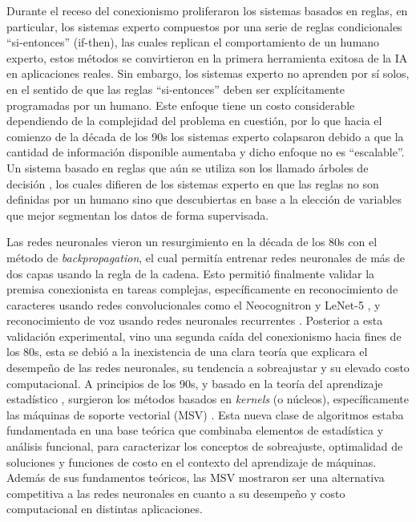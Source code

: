 Durante el receso del conexionismo proliferaron los sistemas basados en reglas, en particular, los sistemas experto compuestos por una serie de reglas condicionales “si-entonces” (if-then), las cuales replican el comportamiento de un humano experto, estos métodos se convirtieron en la primera herramienta exitosa de la IA en aplicaciones reales. Sin embargo, los sistemas experto no aprenden por sí solos, en el sentido de que las reglas “si-entonces” deben ser explícitamente programadas por un humano. Este enfoque tiene un costo considerable dependiendo de la complejidad del problema en cuestión, por lo que hacia el comienzo de la década de los 90s los sistemas experto colapsaron debido a que la cantidad de información disponible aumentaba y dicho enfoque no es “escalable”. Un sistema basado en reglas que aún se utiliza son los llamado árboles de decisión \cite{breiman_1984}, los cuales difieren de los sistemas experto en que las reglas no son definidas por un humano sino que descubiertas en base a la elección de variables que mejor segmentan los datos de forma supervisada.

Las redes neuronales vieron un resurgimiento en la década de los 80s con el método de \emph{backpropagation}, el cual permitía entrenar redes neuronales de más de dos capas usando la regla de la cadena. Esto permitió finalmente validar la premisa conexionista en tareas complejas, específicamente en reconocimiento de caracteres usando redes convolucionales como el Neocognitron \cite{fukushima_1980} y LeNet-5 \cite{lecun_1989}, y reconocimiento de voz usando redes neuronales recurrentes \cite{hopfield_1982}. Posterior a esta validación experimental, vino una segunda caída del conexionismo hacia fines de los 80s, esta se debió a la inexistencia de una clara teoría que explicara el desempeño de las redes neuronales, su tendencia a sobreajustar y su elevado costo computacional. A principios de los 90s, y basado en la teoría del aprendizaje estadístico \cite{vapnik_1971}, surgieron los métodos basados en \emph{kernels} (o núcleos), específicamente las máquinas de soporte vectorial (MSV) \cite{boser_1992}. Esta nueva clase de algoritmos estaba fundamentada en una base teórica que combinaba elementos de estadística y análisis funcional, para caracterizar los conceptos de sobreajuste, optimalidad de soluciones y funciones de costo en el contexto del aprendizaje de máquinas. Además de sus fundamentos teóricos, las MSV mostraron ser una alternativa competitiva a las redes neuronales en cuanto a su desempeño y costo computacional en distintas aplicaciones. 

